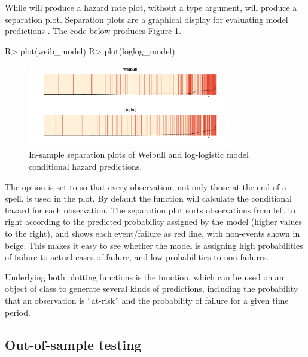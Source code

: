 \documentclass[article]{jss}
\begin{document}
While  will produce a hazard rate plot, without a type argument,
 will produce a separation plot. Separation plots are a graphical
display for evaluating model predictions \citep{greenhill2011separation}. The code below produces Figure \ref{insamp}.

\begin{CodeChunk}
\begin{CodeInput}
R> plot(weib_model)
R> plot(loglog_model)
\end{CodeInput}
\end{CodeChunk}

\begin{figure}
\begin{center}
\includegraphics[width=0.8\textwidth]{graphics/sepplots.pdf}
\caption{In-sample separation plots of Weibull and log-logistic model conditional hazard predictions.}
\label{insamp}
\end{center}
\end{figure}

The option  is set to  so that every
observation, not only those at the end of a spell, is used in the plot.
By default the  function will calculate the conditional
hazard for each observation. The separation plot sorts observations from
left to right according to the predicted probability assigned by the
model (higher values to the right), and shows each event/failure as red
line, with non-events shown in beige. This makes it easy to see whether
the model is assigning high probabilities of failure to actual cases of
failure, and low probabilities to non-failures.

Underlying both plotting functions is the  function, which
can be used on an object of class  to generate several kinds
of predictions, including the probability that an observation is
``at-risk'' and the probability of failure for a given time period.

\subsection{Out-of-sample testing}
\end{document}
